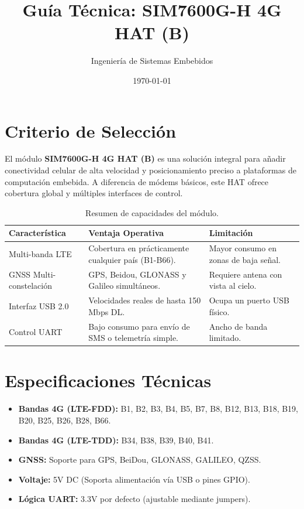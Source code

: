 \documentclass[11pt]{article}
\title{Guía Técnica: SIM7600G-H 4G HAT (B)}
\author{Ingeniería de Sistemas Embebidos}
\date{\today}
\begin{document}
\maketitle
\tableofcontents
\newpage

\section{Criterio de Selección}

El módulo \textbf{SIM7600G-H 4G HAT (B)} es una solución integral para añadir conectividad celular de alta velocidad y posicionamiento preciso a plataformas de computación embebida. A diferencia de módems básicos, este HAT ofrece cobertura global y múltiples interfaces de control.

\begin{table}[h]
    \centering
    \small
    \begin{tabular}{p{}p{}p{}}
        \toprule
        \textbf{Característica} & \textbf{Ventaja Operativa} & \textbf{Limitación} \\
        \midrule
        Multi-banda LTE & Cobertura en prácticamente cualquier país (B1-B66). & Mayor consumo en zonas de baja señal. \\
        GNSS Multi-constelación & GPS, Beidou, GLONASS y Galileo simultáneos. & Requiere antena con vista al cielo. \\
        Interfaz USB 2.0 & Velocidades reales de hasta 150 Mbps DL. & Ocupa un puerto USB físico. \\
        Control UART & Bajo consumo para envío de SMS o telemetría simple. & Ancho de banda limitado. \\
        \bottomrule
    \end{tabular}
    \caption{Resumen de capacidades del módulo.}
\end{table}

\section{Especificaciones Técnicas}

\begin{itemize}
    \item \textbf{Bandas 4G (LTE-FDD):} B1, B2, B3, B4, B5, B7, B8, B12, B13, B18, B19, B20, B25, B26, B28, B66.
    \item \textbf{Bandas 4G (LTE-TDD):} B34, B38, B39, B40, B41.
    \item \textbf{GNSS:} Soporte para GPS, BeiDou, GLONASS, GALILEO, QZSS.
    \item \textbf{Voltaje:} 5V DC (Soporta alimentación vía USB o pines GPIO).
    \item \textbf{Lógica UART:} 3.3V por defecto (ajustable mediante jumpers).
\end{itemize}
\end{document}
